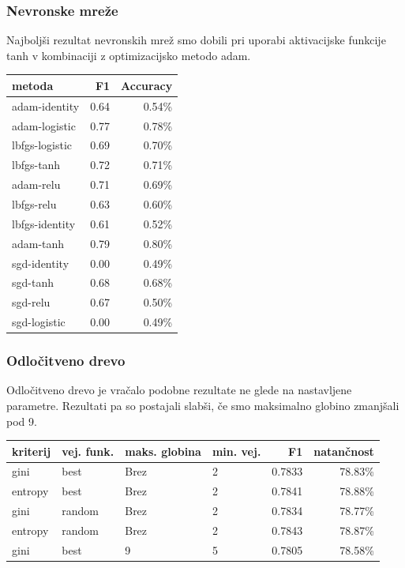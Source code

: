 \documentclass{acm_proc_article-sp}
\begin{document}
\subsubsection{Nevronske mreže}
Najboljši rezultat nevronskih mrež smo dobili pri uporabi aktivacijske funkcije tanh v kombinaciji z optimizacijsko metodo adam.
\begin{center}
 \small
 \setlength{\tabcolsep}{3pt}
 \begin{tabular}{|l r r|}
  \hline
  metoda & F1 & Accuracy \\
  \hline \hline
  adam-identity & 0.64 & 0.54\% \\
  \hline
  adam-logistic & 0.77 & 0.78\% \\
  \hline
  lbfgs-logistic & 0.69 & 0.70\% \\
  \hline
  lbfgs-tanh & 0.72 & 0.71\% \\
  \hline
  adam-relu & 0.71 & 0.69\% \\
  \hline
  lbfgs-relu & 0.63 & 0.60\% \\
  \hline
  lbfgs-identity & 0.61 & 0.52\% \\
  \hline
  adam-tanh & 0.79 & 0.80\% \\
  \hline
  sgd-identity & 0.00 & 0.49\% \\
  \hline
  sgd-tanh & 0.68 & 0.68\% \\
  \hline
  sgd-relu & 0.67 & 0.50\% \\
  \hline
  sgd-logistic & 0.00 & 0.49\% \\
  \hline
 \end{tabular}
\end{center}
\normalsize


\subsubsection{Odločitveno drevo}
Odločitveno drevo je vračalo podobne rezultate ne glede na nastavljene parametre. Rezultati pa so postajali slabši, če smo maksimalno globino zmanjšali pod 9.
\begin{center}
 \small
 \setlength{\tabcolsep}{3pt}
 \begin{tabular}{|l l l l r r|}
 \hline
  kriterij & vej. funk. & maks. globina & min. vej. & F1 & natančnost  \\
  \hline \hline
  gini & best & Brez & 2 & 0.7833 & 78.83\%  \\
  \hline
  entropy & best & Brez & 2 & 0.7841 & 78.88\%  \\
  \hline
  gini & random & Brez & 2 & 0.7834 & 78.77\%  \\
  \hline
  entropy & random & Brez & 2 & 0.7843 & 78.87\%  \\
  \hline
  gini & best & 9 & 5 & 0.7805 & 78.58\% \\
 \hline
\end{tabular}
\end{center}
\normalsize
\end{document}

